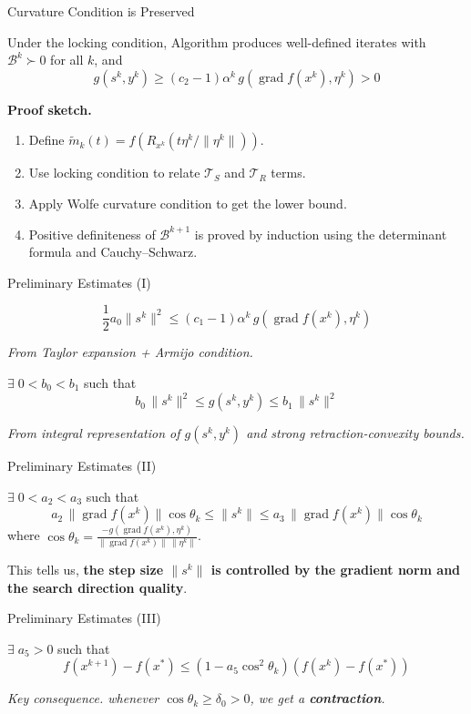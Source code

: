 \documentclass[10pt,aspectratio=169]{beamer}
\DeclareMathOperator{\grad}{grad}
\newcommand{\VT}{\mathcal{T}}
\begin{document}
\begin{frame}{Curvature Condition is Preserved}
\begin{lemma}
Under the locking condition, Algorithm produces well-defined iterates with $\mathcal{B}^k\succ 0$ for all $k$, and
$$g(s^k,y^k) \geq (c_2-1)\alpha^k\,g(\grad f(x^k),\eta^k) > 0$$
\end{lemma}

\textbf{Proof sketch.}
\begin{enumerate}
    \item Define $\widetilde{m}_k(t) = f(R_{x^k}(t\eta^k/\|\eta^k\|))$.
    \item Use locking condition to relate $\VT_S$ and $\VT_R$ terms.
    \item Apply Wolfe curvature condition to get the lower bound.
    \item Positive definiteness of $\mathcal{B}^{k+1}$ is proved by induction using the determinant formula and Cauchy--Schwarz.
\end{enumerate}
\end{frame}

\begin{frame}{Preliminary Estimates (I)}
\begin{lemma}
$$\frac{1}{2}a_0\|s^k\|^2 \leq (c_1-1)\alpha^k\,g(\grad f(x^k),\eta^k)$$
\end{lemma}
\emph{From Taylor expansion + Armijo condition.}

\bigskip
\begin{lemma}
$\exists\; 0<b_0<b_1$ such that
$$b_0\,\|s^k\|^2 \leq g(s^k,y^k) \leq b_1\,\|s^k\|^2$$
\end{lemma}
\emph{From integral representation of $g(s^k,y^k)$ and strong retraction-convexity bounds.}
\end{frame}

\begin{frame}{Preliminary Estimates (II)}
\begin{lemma}
$\exists\; 0<a_2<a_3$ such that
$$a_2\,\|\grad f(x^k)\|\cos\theta_k \leq \|s^k\| \leq a_3\,\|\grad f(x^k)\|\cos\theta_k$$
where $\cos\theta_k = \frac{-g(\grad f(x^k),\eta^k)}{\|\grad f(x^k)\|\,\|\eta^k\|}$.
\end{lemma}

\bigskip
This tells us, \textbf{the step size $\|s^k\|$ is controlled by the gradient norm and the search direction quality}.
\end{frame}

\begin{frame}{Preliminary Estimates (III)}

\begin{lemma}
$\exists\; a_5>0$ such that
$$f(x^{k+1}) - f(x^\ast) \leq (1-a_5\cos^2\theta_k)(f(x^k)-f(x^\ast))$$
\end{lemma}
\emph{Key consequence. whenever $\cos\theta_k\geq\delta_0>0$, we get a \textbf{contraction}.}
\end{frame}
\end{document}
